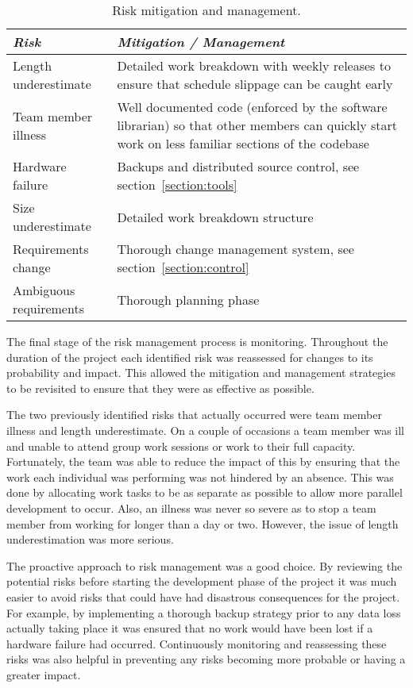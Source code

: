 \begin{table*}
	\small
	\begin{tabular}{l p{37em}}
		\toprule
		\emph{Risk} & \emph{Mitigation / Management} \\
		\midrule
		Length underestimate & Detailed work breakdown with weekly releases to ensure that
			schedule slippage can be caught early \\
		Team member illness & Well documented code (enforced by the software librarian) so
			that other members can quickly start work on less familiar sections of
			the codebase \\
		Hardware failure & Backups and distributed source control, see section~\ref{section:tools} \\
		Size underestimate & Detailed work breakdown structure \\
		Requirements change & Thorough change management system, see section~\ref{section:control} \\
		Ambiguous requirements & Thorough planning phase \\
		\bottomrule
	\end{tabular}
	\vspace{1.5em}
	\caption{Risk mitigation and management.}
	\label{tab:rmm}
\end{table*}
 
The final stage of the risk management process is monitoring. Throughout the duration of
the project each identified risk was reassessed for changes to its probability and
impact. This allowed the mitigation and management strategies to be revisited to ensure that
they were as effective as possible.
 
The two previously identified risks that actually occurred were team member illness and length underestimate.
On a couple of occasions a team member was ill and unable to attend group work sessions or work to their full
capacity. Fortunately, the team was able to reduce the impact of this by ensuring that the work each individual
was performing was not hindered by an absence. This was done by allocating work tasks to be as separate as
possible to allow more parallel development to occur. Also, an illness was never so severe as to stop a team
member from working for longer than a day or two. However, the issue of length underestimation was more serious.
 
%
 
The proactive approach to risk management was a good choice. By reviewing the potential
risks before starting the development phase of the project it was much easier to avoid risks that could
have had disastrous consequences for the project. For example, by implementing a thorough backup strategy
prior to any data loss actually taking place it was ensured that no work would have been lost if a hardware
failure had occurred. Continuously monitoring and reassessing these risks was also helpful in preventing
any risks becoming more probable or having a greater impact.
